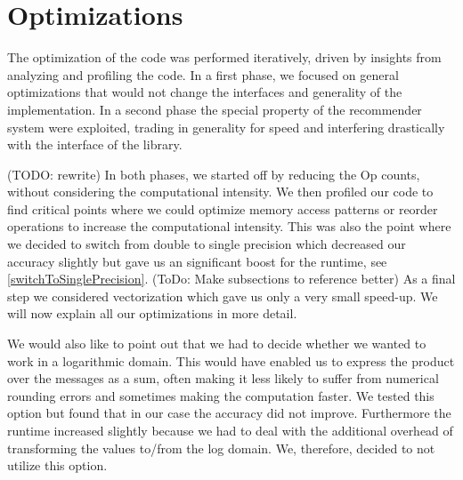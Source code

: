 \section{Optimizations}\label{sec:method}




The optimization of the code was performed iteratively, driven by insights from analyzing and profiling the code. In a first phase, we focused on general optimizations that would not change the interfaces and generality of the implementation. In a second phase the special property of the recommender system were exploited, trading in generality for speed and interfering drastically with the interface of the library.

(TODO: rewrite) 
In both phases, we started off by reducing the Op counts, without considering the computational intensity. We then profiled our code to find critical points where we could optimize memory access patterns or reorder operations to increase the computational intensity. This was also the point where we decided to switch from double to single precision which decreased our accuracy slightly but gave us an significant boost for the runtime, see \ref{switchToSinglePrecision}. (ToDo: Make subsections to reference better)
As a final step we considered vectorization which gave us only a very small speed-up. We will now explain all our optimizations in more detail.

We would also like to point out that we had to decide whether we wanted to work in a logarithmic domain. This would have enabled us to express the product over the messages as a sum, often making it less likely to suffer from numerical rounding errors and sometimes making the computation faster. We tested this option but found that in our case the accuracy did not improve. Furthermore the runtime increased slightly because we had to deal with the additional overhead of transforming the values to/from the log domain. We, therefore, decided to not utilize this option.

